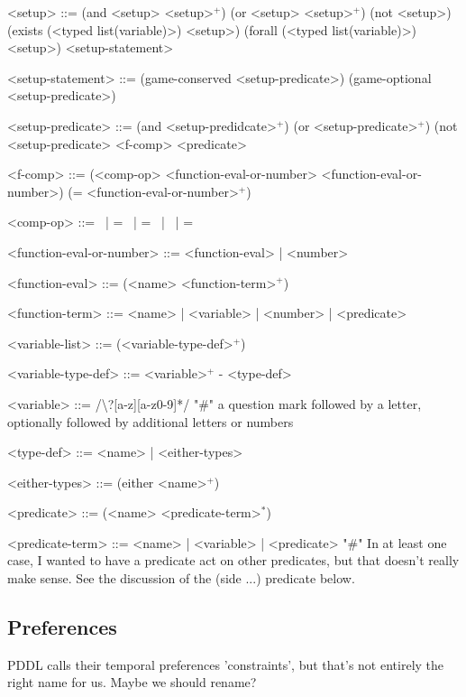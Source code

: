 \documentclass{article}
\begin{document}
\begin{grammar}
<setup> ::= (and <setup> <setup>$^+$) \alt
    (or <setup> <setup>$^+$) \alt
    (not <setup>) \alt
    (exists (<typed list(variable)>) <setup>) \alt
    (forall (<typed list(variable)>) <setup>) \alt
    <setup-statement>

<setup-statement> ::= (game-conserved <setup-predicate>) \alt
    (game-optional <setup-predicate>)

<setup-predicate> ::= (and <setup-predidcate>$^+$) \alt
    (or <setup-predicate>$^+$) \alt
    (not <setup-predicate> \alt
    <f-comp> \alt
    <predicate>


<f-comp> ::= (<comp-op> <function-eval-or-number> <function-eval-or-number>) \alt
    (= <function-eval-or-number>$^+$)
    
<comp-op> ::=  \textlangle \ | \textlangle = \ | = \ | \textrangle \ | \textrangle =

<function-eval-or-number> ::= <function-eval> | <number>

<function-eval> ::= (<name> <function-term>$^+$)

<function-term> ::= <name> | <variable> | <number> | <predicate>

<variable-list> ::= (<variable-type-def>$^+$)

<variable-type-def> ::= <variable>$^+$ - <type-def>

<variable> ::= /\textbackslash?[a-z][a-z0-9]*/  "#" a question mark followed by a letter, optionally followed by additional letters or numbers

<type-def> ::= <name> | <either-types>

<either-types> ::= (either <name>$^+$)

<predicate> ::= (<name> <predicate-term>$^*$)

<predicate-term> ::= <name> | <variable> | <predicate> "#" In at least one case, I wanted to have a predicate act on other predicates, but that doesn't really make sense. See the discussion of the (side ...) predicate below.


\end{grammar}



\subsection{Preferences}
PDDL calls their temporal preferences 'constraints', but that's not entirely the right name for us. Maybe we should rename? \\
\end{document}
